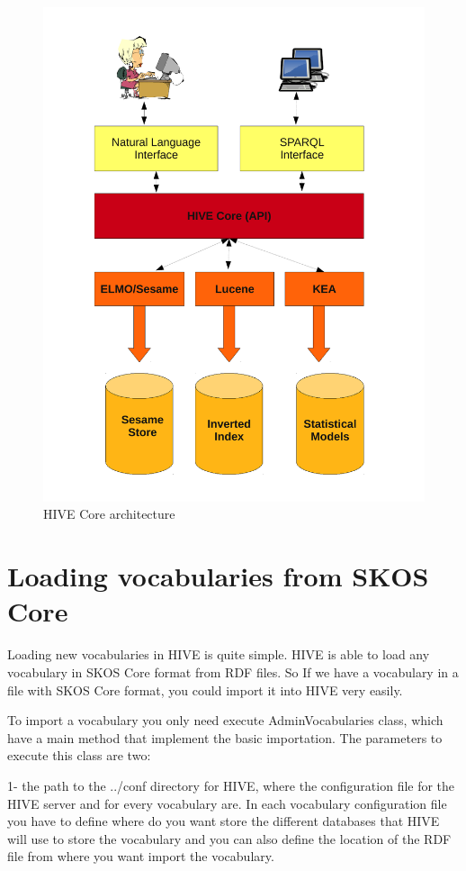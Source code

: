 \begin{figure}
\centering
\includegraphics[width=400pt]{img/hive-architecture.pdf}
\caption{HIVE Core architecture}
\label{hivearchitecture}
\end{figure}
 
\section{Loading vocabularies from SKOS Core}\label{configuration}

Loading new vocabularies in HIVE is quite simple. HIVE is able to load any vocabulary in SKOS Core format from RDF files. So If we have 
a vocabulary in a file with SKOS Core format, you could import it into HIVE very easily.

To import a vocabulary you only need execute AdminVocabularies class, which have a main method that implement the basic importation. 
The parameters to execute this class are two:

1- the path to the ../conf directory for HIVE, where the configuration file for the HIVE server and for every vocabulary are. 
In each vocabulary configuration file you have to define where do you want store the different databases that HIVE will use to store the 
vocabulary and you can also define the location of the RDF file from where you want import the vocabulary.


